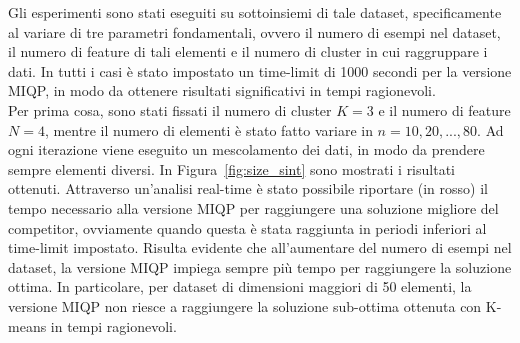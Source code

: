 \documentclass{article}
\begin{document}
    Gli esperimenti sono stati eseguiti su sottoinsiemi di tale dataset, specificamente al variare di tre parametri fondamentali, ovvero il numero di esempi nel dataset, il numero di feature di tali elementi e il numero di cluster in cui raggruppare i dati. In tutti i casi è stato impostato un time-limit di 1000 secondi per la versione MIQP, in modo da ottenere risultati significativi in tempi ragionevoli.\\
    Per prima cosa, sono stati fissati il numero di cluster $K=3$ e il numero di feature $N=4$, mentre il numero di elementi è stato fatto variare in $n=10,20,...,80$. Ad ogni iterazione viene eseguito un mescolamento dei dati, in modo da prendere sempre elementi diversi. In Figura~\ref{fig:size_sint} sono mostrati i risultati ottenuti. Attraverso un'analisi real-time è stato possibile riportare (in rosso) il tempo necessario alla versione MIQP per raggiungere una soluzione migliore del competitor, ovviamente quando questa è stata raggiunta in periodi inferiori al time-limit impostato.
    Risulta evidente che all'aumentare del numero di esempi nel dataset, la versione MIQP impiega sempre più tempo per raggiungere la soluzione ottima. In particolare, per dataset di dimensioni maggiori di 50 elementi, la versione MIQP non riesce a raggiungere la soluzione sub-ottima ottenuta con K-means in tempi ragionevoli.\\
\end{document}
